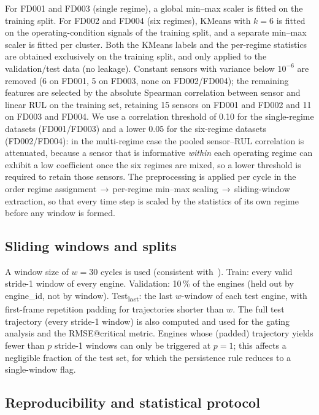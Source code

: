 \documentclass[5p,times,authoryear]{elsarticle}
\begin{document}
For FD001 and FD003 (single regime), a global min--max scaler is fitted on the training split. For FD002 and FD004 (six regimes), KMeans with $k{=}6$ is fitted on the operating-condition signals of the training split, and a separate min--max scaler is fitted per cluster. Both the KMeans labels and the per-regime statistics are obtained exclusively on the training split, and only applied to the validation/test data (no leakage). Constant sensors with variance below $10^{-6}$ are removed (6 on FD001, 5 on FD003, none on FD002/FD004); the remaining features are selected by the absolute Spearman correlation between sensor and linear RUL on the training set, retaining 15 sensors on FD001 and FD002 and 11 on FD003 and FD004. We use a correlation threshold of 0.10 for the single-regime datasets (FD001/FD003) and a lower 0.05 for the six-regime datasets (FD002/FD004): in the multi-regime case the pooled sensor--RUL correlation is attenuated, because a sensor that is informative \emph{within} each operating regime can exhibit a low coefficient once the six regimes are mixed, so a lower threshold is required to retain those sensors. The preprocessing is applied per cycle in the order regime assignment\,$\rightarrow$\,per-regime min--max scaling\,$\rightarrow$\,sliding-window extraction, so that every time step is scaled by the statistics of its own regime before any window is formed.

\subsection{Sliding windows and splits}\label{sec:exp-windows}

A window size of $w{=}30$ cycles is used (consistent with~\citep{li2018remaining}). Train: every valid stride-1 window of every engine. Validation: 10\,\% of the engines (held out by engine\_id, not by window). Test\textsubscript{last}: the last $w$-window of each test engine, with first-frame repetition padding for trajectories shorter than $w$. The full test trajectory (every stride-1 window) is also computed and used for the gating analysis and the RMSE@critical metric. Engines whose (padded) trajectory yields fewer than $p$ stride-1 windows can only be triggered at $p{=}1$; this affects a negligible fraction of the test set, for which the persistence rule reduces to a single-window flag.

\subsection{Reproducibility and statistical protocol}\label{sec:exp-repro}
\end{document}
